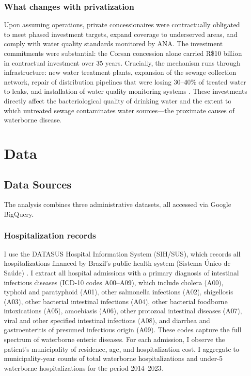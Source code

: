 \documentclass[12pt]{article}
\begin{document}
\subsubsection*{What changes with privatization} Upon assuming operations, private concessionaires were contractually obligated to meet phased investment targets, expand coverage to underserved areas, and comply with water quality standards monitored by ANA. The investment commitments were substantial: the Corsan concession alone carried R\$10 billion in contractual investment over 35 years. Crucially, the mechanism runs through infrastructure: new water treatment plants, expansion of the sewage collection network, repair of distribution pipelines that were losing 30--40\% of treated water to leaks, and installation of water quality monitoring systems \citep{bndes2022corsan}. These investments directly affect the bacteriological quality of drinking water and the extent to which untreated sewage contaminates water sources---the proximate causes of waterborne disease.


\section{Data}

\subsection{Data Sources}

The analysis combines three administrative datasets, all accessed via Google BigQuery.

\subsubsection*{Hospitalization records} I use the DATASUS Hospital Information System (SIH/SUS), which records all hospitalizations financed by Brazil's public health system (Sistema \'{U}nico de Sa\'{u}de) \citep{datasus2024}. I extract all hospital admissions with a primary diagnosis of intestinal infectious diseases (ICD-10 codes A00--A09), which include cholera (A00), typhoid and paratyphoid (A01), other salmonella infections (A02), shigellosis (A03), other bacterial intestinal infections (A04), other bacterial foodborne intoxications (A05), amoebiasis (A06), other protozoal intestinal diseases (A07), viral and other specified intestinal infections (A08), and diarrhea and gastroenteritis of presumed infectious origin (A09). These codes capture the full spectrum of waterborne enteric diseases. For each admission, I observe the patient's municipality of residence, age, and hospitalization cost. I aggregate to municipality-year counts of total waterborne hospitalizations and under-5 waterborne hospitalizations for the period 2014--2023.
\end{document}
